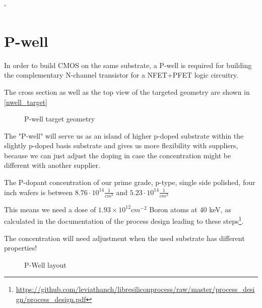 `\section{P-well}\label{pwell_chapter}

In order to build CMOS on the same substrate, a P-well is required for building the complementary N-channel transistor for a NFET+PFET logic circuitry.

The cross section as well as the top view of the targeted geometry are shown in \autoref{nwell_target}

\begin{figure}[H]
	\centering
	\begin{tikzpicture}[node distance = 3cm, auto, thick,scale=\CrossAndTopSectionBig, every node/.style={transform shape}]
		
	\end{tikzpicture}
	\begin{tikzpicture}[node distance = 3cm, auto, thick,scale=\CrossAndTopSectionBig, every node/.style={transform shape}]
		
	\end{tikzpicture}
	\caption{P-well target geometry}
	\label{pwell_target}
\end{figure}

The "P-well" will serve us as an island of higher p-doped substrate within the slightly p-doped basis substrate and gives us more flexibility with suppliers, because we can just adjust the doping in case the concentration might be different with another supplier.

The P-dopant concentration of our prime grade, p-type, single side polished, four inch wafers is between $8.76 \cdot 10^14 \frac{1}{cm^3}$ and $5.23 \cdot 10^14 \frac{1}{cm^3}$

This means we need a dose of $1.93\times10^{12}cm^{-2}$ Boron atoms at 40 keV, as calculated in the documentation of the process design leading to these steps\footnote{\url{https://github.com/leviathanch/libresiliconprocess/raw/master/process_design/process_design.pdf}}.

The concentration will need adjustment when the used substrate has different properties!

\begin{figure}[H]
	\centering
	\begin{tikzpicture}[node distance =1cm, auto, thick,scale=\VLSILayout, every node/.style={transform shape}]
		
	\end{tikzpicture}
	\caption{P-Well layout}
	\label{pwell_layout}
\end{figure}

